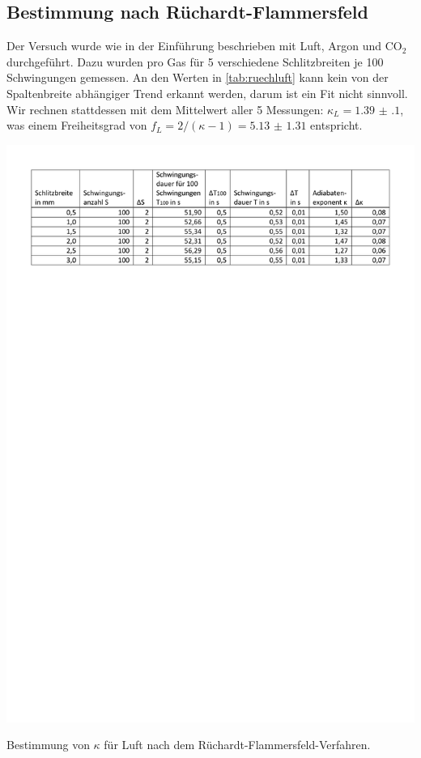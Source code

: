 \subsection{Bestimmung nach Rüchardt-Flammersfeld}
Der Versuch wurde wie in der Einführung beschrieben mit Luft, Argon und $\mathrm{CO}_2$ durchgeführt. Dazu wurden pro Gas für 5 verschiedene Schlitzbreiten je 100 Schwingungen gemessen. An den Werten in \cref{tab:ruechluft} kann kein von der Spaltenbreite abhängiger Trend erkannt werden, darum ist ein Fit nicht sinnvoll. Wir rechnen stattdessen mit dem Mittelwert aller 5 Messungen: $\kappa_L=\num{1.39(10)}$, was einem Freiheitsgrad von $f_L=2/(\kappa-1)=\num{5.13(131)}$ entspricht.
\begin{table}[H]
\centering
\includegraphics[width=0.6\linewidth,trim=5cm 23cm 5cm 1cm]{res/Luft}
\caption{Bestimmung von $\kappa$ für Luft nach dem Rüchardt-Flammersfeld-Verfahren.}
\label{tab:ruechluft}
\end{table}

